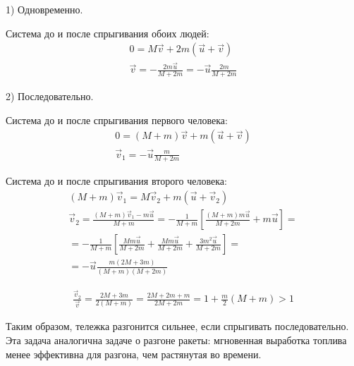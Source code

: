 \documentclass[a5paper,10pt]{article}\usepackage[usenames,dvipsnames]{color}
\begin{document}
\begin{figure}[H]
    \centering
{}
\end{figure}
1) Одновременно.

Система до и после спрыгивания обоих людей:
\begin{gather*}
    0=M\vec{v}+2m(\vec{u}+\vec{v})\\
    \vec{v}=-\frac{2m\vec{u}}{M+2m}=-\vec{u}\frac{2m}{M+2m}
\end{gather*}

2) Последовательно.

Система до и после спрыгивания первого человека:
\begin{gather*}
    0=(M+m)\vec{v}+m(\vec{u}+\vec{v})\\
    \vec{v}_{1}=-\vec{u}\frac{m}{M+2m}
\end{gather*}

Система до и после спрыгивания второго человека:
\begin{gather*}
    (M+m)\vec{v}_{1}=M\vec{v}_{2}+m(\vec{u}+\vec{v}_{2})\\
    \vec{v}_2=\frac{(M+m)\vec{v}_{1}-m\vec{u}}{M+m}=-\frac{1}{M+m}\left[\frac{(M+m)m\vec{u}}{M+2m}+m\vec{u}\right]=\\=-\frac{1}{M+m}
    \left[\frac{Mm\vec{u}}{M+2m}+\frac{Mm\vec{u}}{M+2m}+\frac{3m^2\vec{u}}{M+2m}\right]=\\=-\vec{u}\frac{m(2M+3m)}{(M+m)(M+2m)}
\end{gather*}

\begin{gather*}
    \frac{\vec{v}_2}{\vec{v}}=\frac{2M+3m}{2(M+m)}=
    \frac{2M+2m+m}{2M+2m}=1+\frac{m}{2}(M+m)>1
\end{gather*}

Таким образом, тележка разгонится сильнее, если спрыгивать последовательно. Эта задача аналогична задаче о разгоне ракеты: мгновенная выработка топлива менее эффективна для разгона, чем растянутая во времени. 
\end{document}
